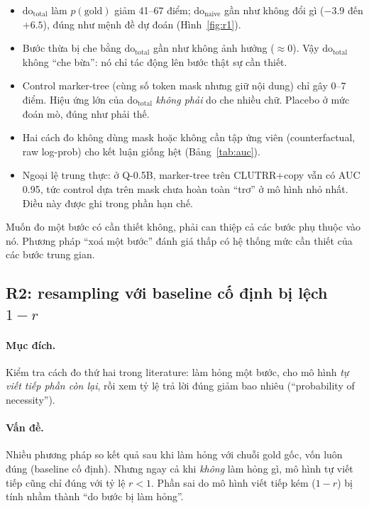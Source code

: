 \documentclass[11pt]{article}
\newcommand{\dn}{\mathrm{do}_{\text{naive}}}
\newcommand{\dt}{\mathrm{do}_{\text{total}}}
\begin{document}
\begin{cachdoc}
\begin{itemize}[leftmargin=*,itemsep=1pt]
\item $\dt$ làm $p(\text{gold})$ giảm 41--67 điểm; $\dn$ gần như không đổi gì ($-3.9$ đến $+6.5$),
  đúng như mệnh đề dự đoán (Hình~\ref{fig:r1}).
\item Bước thừa bị che bằng $\dt$ gần như không ảnh hưởng ($\approx 0$). Vậy $\dt$ không ``che
  bừa'': nó chỉ tác động lên bước thật sự cần thiết.
\item Control marker-tree (cùng số token mask nhưng giữ nội dung) chỉ gây 0--7 điểm. Hiệu ứng lớn
  của $\dt$ \emph{không phải} do che nhiều chữ. Placebo ở mức đoán mò, đúng như phải thế.
\item Hai cách đo không dùng mask hoặc không cần tập ứng viên (counterfactual, raw log-prob) cho
  kết luận giống hệt (Bảng~\ref{tab:auc}).
\item Ngoại lệ trung thực: ở Q-0.5B, marker-tree trên CLUTRR+copy vẫn có AUC 0.95, tức control
  dựa trên mask chưa hoàn toàn ``trơ'' ở mô hình nhỏ nhất. Điều này được ghi trong phần hạn chế.
\end{itemize}
\end{cachdoc}

\begin{ketluan}
Muốn đo một bước có cần thiết không, phải can thiệp cả các bước phụ thuộc vào nó. Phương pháp
``xoá một bước'' đánh giá thấp có hệ thống mức cần thiết của các bước trung gian.
\end{ketluan}

\subsection{R2: resampling với baseline cố định bị lệch $1-r$}

\paragraph{Mục đích.} Kiểm tra cách đo thứ hai trong literature: làm hỏng một bước, cho mô hình
\emph{tự viết tiếp phần còn lại}, rồi xem tỷ lệ trả lời đúng giảm bao nhiêu (``probability of
necessity'').

\paragraph{Vấn đề.} Nhiều phương pháp so kết quả sau khi làm hỏng với chuỗi gold gốc, vốn luôn
đúng (baseline cố định). Nhưng ngay cả khi \emph{không} làm hỏng gì, mô hình tự viết tiếp cũng chỉ
đúng với tỷ lệ $r<1$. Phần sai do mô hình viết tiếp kém ($1-r$) bị tính nhầm thành ``do bước bị
làm hỏng''.
\end{document}

